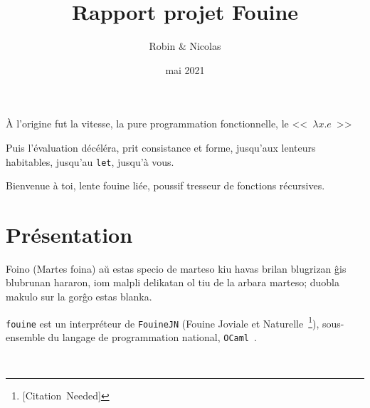 \documentclass[a4, 11pt, titlepage]{article}
\title{Rapport projet Fouine}
\author{Robin \bsc{Jourde} \& Nicolas \bsc{Nardino}}
\date{mai 2021}
\begin{document}
\maketitle

\begin{center}
  \small
  
\end{center}

\newpage

\epigraph{
À l'origine fut la vitesse, la pure programmation fonctionnelle, le
<<~$\lambda x.e$~>>

Puis l'évaluation décéléra, prit consistance et forme, jusqu'aux lenteurs
habitables, jusqu'au \texttt{let}, jusqu'à vous.

Bienvenue à toi, lente fouine liée, poussif tresseur de fonctions
récursives.}{\cite{LaHorde}}




\tableofcontents

\section{Présentation}

Foino (Martes foina) aŭ estas specio de marteso kiu havas brilan
blugrizan ĝis blubrunan hararon, iom malpli delikatan ol tiu de la
arbara marteso; duobla makulo sur la gorĝo estas blanka.~\cite{wiki:001}

\texttt{fouine} est un interpréteur de \texttt{FouineJN} (Fouine
Joviale et Naturelle~\footnote{[Citation~Needed]}), sous-ensemble du
langage de programmation national, \texttt{OCaml}~\cite{Landin66}.

~\cite{Tchana21}




\end{document}
